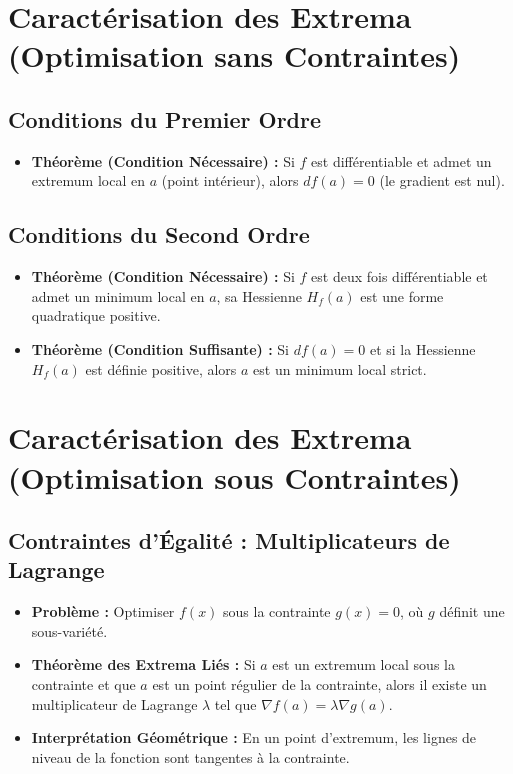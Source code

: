 \documentclass[12pt, a4paper, parskip=full]{report}
\theoremstyle{agregstyle}
\begin{document}
\section{Caractérisation des Extrema (Optimisation sans Contraintes)}
\subsection{Conditions du Premier Ordre}
\begin{itemize}
    \item \textbf{Théorème (Condition Nécessaire) :} Si $f$ est différentiable et admet un extremum local en $a$ (point intérieur), alors $df(a)=0$ (le gradient est nul).
\end{itemize}
\subsection{Conditions du Second Ordre}
\begin{itemize}
    \item \textbf{Théorème (Condition Nécessaire) :} Si $f$ est deux fois différentiable et admet un minimum local en $a$, sa Hessienne $H_f(a)$ est une forme quadratique positive.
    \item \textbf{Théorème (Condition Suffisante) :} Si $df(a)=0$ et si la Hessienne $H_f(a)$ est définie positive, alors $a$ est un minimum local strict.
\end{itemize}

\section{Caractérisation des Extrema (Optimisation sous Contraintes)}
\subsection{Contraintes d'Égalité : Multiplicateurs de Lagrange}
\begin{itemize}
    \item \textbf{Problème :} Optimiser $f(x)$ sous la contrainte $g(x)=0$, où $g$ définit une sous-variété.
    \item \textbf{Théorème des Extrema Liés :} Si $a$ est un extremum local sous la contrainte et que $a$ est un point régulier de la contrainte, alors il existe un multiplicateur de Lagrange $\lambda$ tel que $\nabla f(a) = \lambda \nabla g(a)$.
    \item \textbf{Interprétation Géométrique :} En un point d'extremum, les lignes de niveau de la fonction sont tangentes à la contrainte.
\end{itemize}
\end{document}
